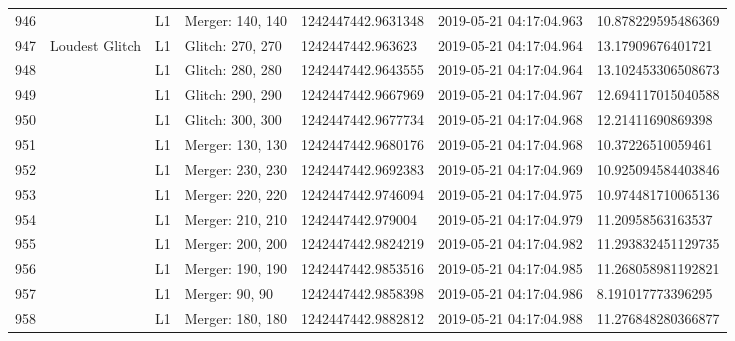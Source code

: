 \begin{longtable}{lllllll}
946  &                                                    &       L1 &  Merger: 140, 140 &  1242447442.9631348 &  2019-05-21 04:17:04.963 &  10.878229595486369 \\
947  &                                     Loudest Glitch &       L1 &  Glitch: 270, 270 &   1242447442.963623 &  2019-05-21 04:17:04.964 &   13.17909676401721 \\
948  &                                                    &       L1 &  Glitch: 280, 280 &  1242447442.9643555 &  2019-05-21 04:17:04.964 &  13.102453306508673 \\
949  &                                                    &       L1 &  Glitch: 290, 290 &  1242447442.9667969 &  2019-05-21 04:17:04.967 &  12.694117015040588 \\
950  &                                                    &       L1 &  Glitch: 300, 300 &  1242447442.9677734 &  2019-05-21 04:17:04.968 &   12.21411690869398 \\
951  &                                                    &       L1 &  Merger: 130, 130 &  1242447442.9680176 &  2019-05-21 04:17:04.968 &   10.37226510059461 \\
952  &                                                    &       L1 &  Merger: 230, 230 &  1242447442.9692383 &  2019-05-21 04:17:04.969 &  10.925094584403846 \\
953  &                                                    &       L1 &  Merger: 220, 220 &  1242447442.9746094 &  2019-05-21 04:17:04.975 &  10.974481710065136 \\
954  &                                                    &       L1 &  Merger: 210, 210 &   1242447442.979004 &  2019-05-21 04:17:04.979 &   11.20958563163537 \\
955  &                                                    &       L1 &  Merger: 200, 200 &  1242447442.9824219 &  2019-05-21 04:17:04.982 &  11.293832451129735 \\
956  &                                                    &       L1 &  Merger: 190, 190 &  1242447442.9853516 &  2019-05-21 04:17:04.985 &  11.268058981192821 \\
957  &                                                    &       L1 &    Merger: 90, 90 &  1242447442.9858398 &  2019-05-21 04:17:04.986 &   8.191017773396295 \\
958  &                                                    &       L1 &  Merger: 180, 180 &  1242447442.9882812 &  2019-05-21 04:17:04.988 &  11.276848280366877 \\

\end{longtable}
